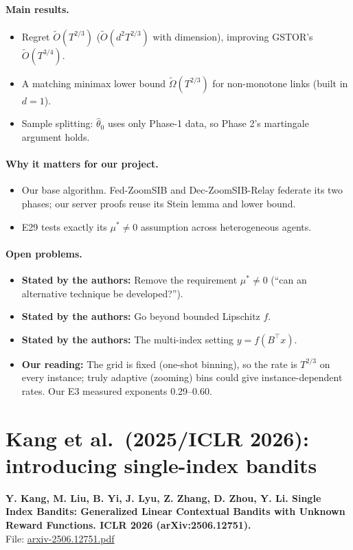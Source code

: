 \documentclass[11pt]{article}
\newcommand{\stated}{\textcolor{green!40!black}{\textbf{Stated by the authors:}}}
\newcommand{\ours}{\textcolor{orange!80!black}{\textbf{Our reading:}}}
\newcommand{\file}[1]{\url{#1}}
\begin{document}
\paragraph{Main results.}
\begin{itemize}\item Regret $\tilde O(T^{2/3})$ ($\tilde O(d^2T^{2/3})$ with dimension), improving GSTOR's $\tilde O(T^{3/4})$.\item A matching minimax lower bound $\tilde\Omega(T^{2/3})$ for non-monotone links (built in $d=1$).\item Sample splitting: $\hat\theta_0$ uses only Phase-1 data, so Phase 2's martingale argument holds.\end{itemize}
\paragraph{Why it matters for our project.}
\begin{itemize}\item Our base algorithm. Fed-ZoomSIB and Dec-ZoomSIB-Relay federate its two phases; our server proofs reuse its Stein lemma and lower bound.\item E29 tests exactly its $\mu^*\neq0$ assumption across heterogeneous agents.\end{itemize}
\paragraph{Open problems.}
\begin{itemize}\item \stated{} Remove the requirement $\mu^*\neq0$ (``can an alternative technique be developed?'').\item \stated{} Go beyond bounded Lipschitz $f$.\item \stated{} The multi-index setting $y=f(B^\top x)$.\item \ours{} The grid is fixed (one-shot binning), so the rate is $T^{2/3}$ on every instance; truly adaptive (zooming) bins could give instance-dependent rates. Our E3 measured exponents 0.29--0.60.\end{itemize}
\section{Kang et al.\ (2025/ICLR 2026): introducing single-index bandits}
\textbf{Y. Kang, M. Liu, B. Yi, J. Lyu, Z. Zhang, D. Zhou, Y. Li. Single Index Bandits: Generalized Linear Contextual Bandits with Unknown Reward Functions. ICLR 2026 (arXiv:2506.12751).}\\ File: \file{arxiv-2506.12751.pdf}
\end{document}
